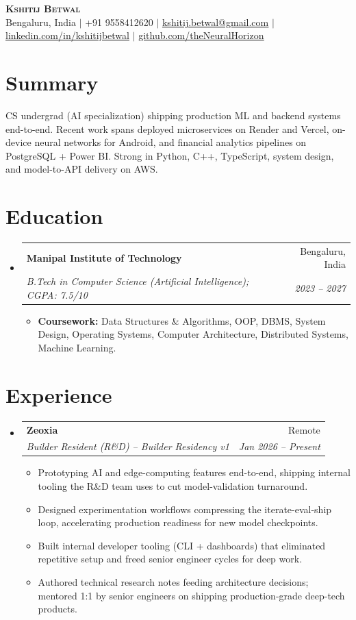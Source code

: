 \documentclass[letterpaper,11pt]{article}
\makeatletter
\newcommand{\resumeItem}[1]{
  \item\small{
    {#1 \vspace{-2pt}}
  }
}
\newcommand{\resumeSubheading}[4]{
  \vspace{-2pt}\item
    \begin{tabular*}{0.97\textwidth}[t]{l@{\extracolsep{\fill}}r}
      \textbf{#1} & #2 \\
      \textit{\small#3} & \textit{\small #4} \\
    \end{tabular*}\vspace{-6pt}
}
\newcommand{\resumeSubHeadingListStart}{\begin{itemize}[leftmargin=0.15in, label={}]}
\newcommand{\resumeSubHeadingListEnd}{\end{itemize}}
\newcommand{\resumeItemListStart}{\begin{itemize}}
\newcommand{\resumeItemListEnd}{\end{itemize}\vspace{-5pt}}
\makeatother
\begin{document}
\begin{center}
    \textbf{\Huge \scshape Kshitij Betwal} \\ \vspace{1pt}
    \small Bengaluru, India $|$ +91 9558412620 $|$ \href{mailto:kshitij.betwal@gmail.com}{\underline{kshitij.betwal@gmail.com}} $|$
    \href{https://linkedin.com/in/kshitijbetwal}{\underline{linkedin.com/in/kshitijbetwal}} $|$
    \href{https://github.com/theNeuralHorizon}{\underline{github.com/theNeuralHorizon}}
\end{center}

\section{Summary}
\small{CS undergrad (AI specialization) shipping production ML and backend systems end-to-end. Recent work spans deployed microservices on Render and Vercel, on-device neural networks for Android, and financial analytics pipelines on PostgreSQL + Power BI. Strong in Python, C++, TypeScript, system design, and model-to-API delivery on AWS.}

\section{Education}
  \resumeSubHeadingListStart
    \resumeSubheading
      {Manipal Institute of Technology}{Bengaluru, India}
      {B.Tech in Computer Science (Artificial Intelligence); CGPA: 7.5/10}{2023 -- 2027}
      \resumeItemListStart
        \resumeItem{\textbf{Coursework:} Data Structures \& Algorithms, OOP, DBMS, System Design, Operating Systems, Computer Architecture, Distributed Systems, Machine Learning.}
      \resumeItemListEnd
  \resumeSubHeadingListEnd

\section{Experience}
  \resumeSubHeadingListStart
    \resumeSubheading
      {Zeoxia}{Remote}
      {Builder Resident (R\&D) -- Builder Residency v1}{Jan 2026 -- Present}
      \resumeItemListStart
        \resumeItem{Prototyping AI and edge-computing features end-to-end, shipping internal tooling the R\&D team uses to cut model-validation turnaround.}
        \resumeItem{Designed experimentation workflows compressing the iterate-eval-ship loop, accelerating production readiness for new model checkpoints.}
        \resumeItem{Built internal developer tooling (CLI + dashboards) that eliminated repetitive setup and freed senior engineer cycles for deep work.}
        \resumeItem{Authored technical research notes feeding architecture decisions; mentored 1:1 by senior engineers on shipping production-grade deep-tech products.}
      \resumeItemListEnd
  \resumeSubHeadingListEnd
\end{document}
